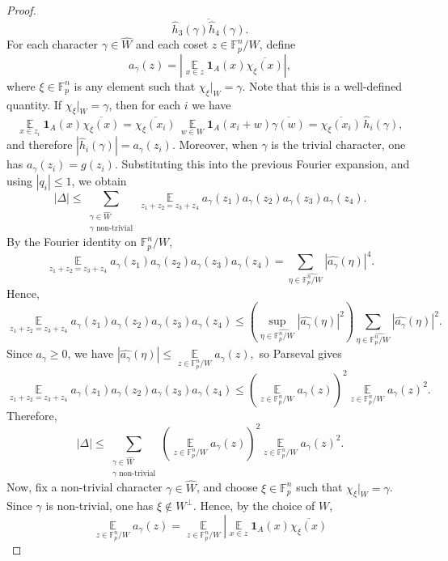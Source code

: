 \documentclass[11pt,reqno]{amsart}
\theoremstyle{plain}
\theoremstyle{remark}
\begin{document}
\begin{proof}
$$\overline{\widehat h_3(\gamma)\widehat h_4(\gamma)}.
$$
For each character $\gamma\in\widehat W$ and each coset $z\in\mathbb F_p^n/W$, define
$$
a_\gamma(z)
=
\left|
\mathop{\mathbb E}\limits_{x\in z}\mathbf 1_A(x)\overline{\chi_\xi(x)}
\right|,
$$
where $\xi\in\mathbb F_p^n$ is any element such that $\chi_\xi|_W=\gamma$. Note that this is a well-defined quantity. If $\chi_\xi|_W=\gamma$, then for each $i$ we have
$$
\mathop{\mathbb E}\limits_{x\in z_i}\mathbf 1_A(x)\overline{\chi_\xi(x)}
=
\overline{\chi_\xi(x_i)}\,
\mathop{\mathbb E}\limits_{w\in W}\mathbf 1_A(x_i+w)\overline{\gamma(w)}
=
\overline{\chi_\xi(x_i)}\,\widehat h_i(\gamma),
$$
and therefore
$
|\widehat h_i(\gamma)|=a_\gamma(z_i).
$
Moreover, when $\gamma$ is the trivial character, one has
$
a_\gamma(z_i)=g(z_i).
$
Substituting this into the previous Fourier expansion, and using $|q_i|\le 1$, we obtain
$$
|\Delta|
\le
\sum_{\substack{\gamma\in\widehat W\\ \gamma\text{ non-trivial}}}
\mathop{\mathbb E}\limits_{z_1+z_2=z_3+z_4}
a_\gamma(z_1)a_\gamma(z_2)a_\gamma(z_3)a_\gamma(z_4).
$$
By the Fourier identity on $\mathbb F_p^n/W$,
$$
\mathop{\mathbb E}\limits_{z_1+z_2=z_3+z_4}
a_\gamma(z_1)a_\gamma(z_2)a_\gamma(z_3)a_\gamma(z_4)
=
\sum_{\eta\in\widehat{\mathbb F_p^n/W}} |\widehat{a_\gamma}(\eta)|^4.
$$
Hence,
$$
\mathop{\mathbb E}\limits_{z_1+z_2=z_3+z_4}
a_\gamma(z_1)a_\gamma(z_2)a_\gamma(z_3)a_\gamma(z_4)
\le
\left(\sup_{\eta\in\widehat{\mathbb F_p^n/W}} |\widehat{a_\gamma}(\eta)|^2\right)
\sum_{\eta\in\widehat{\mathbb F_p^n/W}} |\widehat{a_\gamma}(\eta)|^2.
$$
Since $a_\gamma\ge 0$, we have
$
|\widehat{a_\gamma}(\eta)|\le
\mathop{\mathbb E}\limits_{z\in\mathbb F_p^n/W} a_\gamma(z),
$
so Parseval gives
$$
\mathop{\mathbb E}\limits_{z_1+z_2=z_3+z_4}
a_\gamma(z_1)a_\gamma(z_2)a_\gamma(z_3)a_\gamma(z_4)
\le
\left(
\mathop{\mathbb E}\limits_{z\in\mathbb F_p^n/W} a_\gamma(z)
\right)^2
\mathop{\mathbb E}\limits_{z\in\mathbb F_p^n/W} a_\gamma(z)^2.
$$
Therefore,
$$
|\Delta|
\le
\sum_{\substack{\gamma\in\widehat W\\ \gamma\text{ non-trivial}}}
\left(
\mathop{\mathbb E}\limits_{z\in\mathbb F_p^n/W} a_\gamma(z)
\right)^2
\mathop{\mathbb E}\limits_{z\in\mathbb F_p^n/W} a_\gamma(z)^2.
$$
Now, fix a non-trivial character $\gamma\in\widehat W$, and choose $\xi\in\mathbb F_p^n$ such that $\chi_\xi|_W=\gamma$. Since $\gamma$ is non-trivial, one has $\xi\notin W^\perp$. Hence, by the choice of $W$,
$$
\mathop{\mathbb E}\limits_{z\in\mathbb F_p^n/W} a_\gamma(z)
=
\mathop{\mathbb E}\limits_{z\in\mathbb F_p^n/W}
\left|
\mathop{\mathbb E}\limits_{x\in z}\mathbf 1_A(x)\overline{\chi_\xi(x)}
$$
\end{proof}
\end{document}
